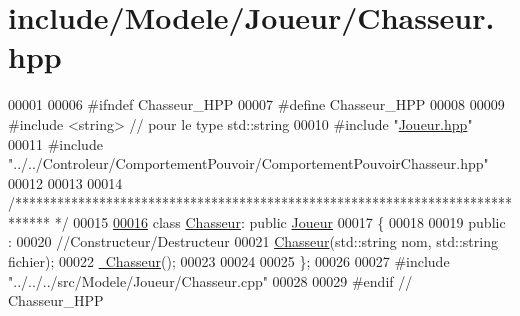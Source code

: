 \hypertarget{_chasseur_8hpp_source}{\section{include/\-Modele/\-Joueur/\-Chasseur.hpp}
}

\begin{DoxyCode}
00001 
00006 \textcolor{preprocessor}{#ifndef Chasseur\_HPP}
00007 \textcolor{preprocessor}{}\textcolor{preprocessor}{#define Chasseur\_HPP}
00008 \textcolor{preprocessor}{}
00009 \textcolor{preprocessor}{#include <string>} \textcolor{comment}{// pour le type std::string}
00010 \textcolor{preprocessor}{#include "\hyperlink{_joueur_8hpp}{Joueur.hpp}"}
00011 \textcolor{preprocessor}{#include "../../Controleur/ComportementPouvoir/ComportementPouvoirChasseur.hpp"}
00012 
00013 
00014 \textcolor{comment}{/*****************************************************************************
      */}
00015 
\hypertarget{_chasseur_8hpp_source_l00016}{}\hyperlink{class_chasseur}{00016} \textcolor{keyword}{class }\hyperlink{class_chasseur}{Chasseur}: \textcolor{keyword}{public} \hyperlink{class_joueur}{Joueur}
00017 \{   
00018     
00019    \textcolor{keyword}{public} :
00020     \textcolor{comment}{//Constructeur/Destructeur}
00021     \hyperlink{class_chasseur_af4bca087f4380663c19cd91cf373cf50}{Chasseur}(std::string nom, std::string fichier);
00022     \hyperlink{class_chasseur_a0a2966005d679a141a3da9beeba165fc}{~Chasseur}();
00023    
00024   
00025 \};
00026 
00027 \textcolor{preprocessor}{#include "../../../src/Modele/Joueur/Chasseur.cpp"}
00028 
00029 \textcolor{preprocessor}{#endif // Chasseur\_HPP}
\end{DoxyCode}
